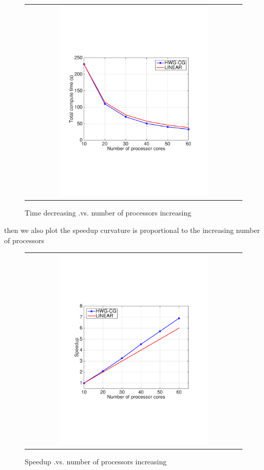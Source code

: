   \begin{figure}[H]
  	\centering
  	\begin{tabular}{c}
  		\includegraphics[width=0.7\textwidth]{./pics/lineartime}
  	\end{tabular}
  	\caption{\footnotesize Time decreasing .vs. number of processors increasing}
  \end{figure}
  
  then we also plot the speedup curvature is proportional to the increasing number of processors
   
   \begin{figure}[H]
   	\centering
   	\begin{tabular}{c}
   		\includegraphics[width=0.7\textwidth]{./pics/linearSp}
   	\end{tabular}
   	\caption{\footnotesize Speedup .vs. number of processors increasing}
   \end{figure}
   
